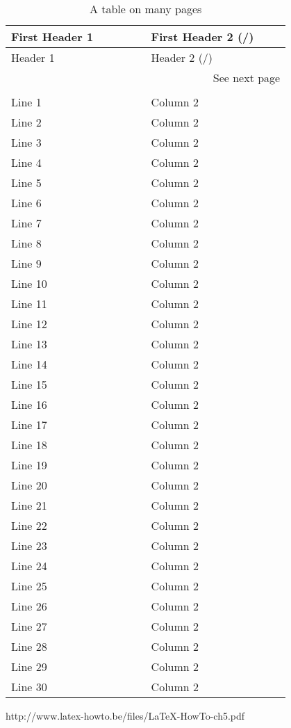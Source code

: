 \begin{longtable}{| p{0.4\linewidth} | p{0.4\linewidth} |}
\caption{\label{myTable2} A table on many pages}\\

\hline First Header 1 & First Header 2
(\pageref{firstLine}/\pageref{lastLine})
\label{firstLine}
\\ \hline \endfirsthead
\hline       Header 1 &       Header 2
(\pageref{firstLine}/\pageref{lastLine})
\\ \hline \endhead
\hline \multicolumn{2}{r}{See next page}
\\ \endfoot
\hline \multicolumn{2}{r}{End of Table}
\label{lastLine}
\\ \endlastfoot
Line  1 & Column 2 \\
Line  2 & Column 2 \\
Line  3 & Column 2 \\
Line  4 & Column 2 \\
Line  5 & Column 2 \\
Line  6 & Column 2 \\
Line  7 & Column 2 \\
Line  8 & Column 2 \\
Line  9 & Column 2 \\
Line 10 & Column 2 \\
Line 11 & Column 2 \\
Line 12 & Column 2 \\
Line 13 & Column 2 \\
Line 14 & Column 2 \\
Line 15 & Column 2 \\
Line 16 & Column 2 \\
Line 17 & Column 2 \\
Line 18 & Column 2 \\
Line 19 & Column 2 \\
Line 20 & Column 2 \\
Line 21 & Column 2 \\
Line 22 & Column 2 \\
Line 23 & Column 2 \\
Line 24 & Column 2 \\
Line 25 & Column 2 \\
Line 26 & Column 2 \\
Line 27 & Column 2 \\
Line 28 & Column 2 \\
Line 29 & Column 2 \\
Line 30 & Column 2 \\
\end{longtable}

\pagebreak

\begin{References}
http://www.latex-howto.be/files/LaTeX-HowTo-ch5.pdf
\end{References}
